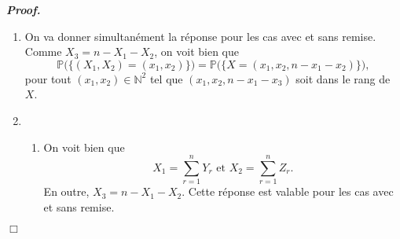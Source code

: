 \documentclass[11pt,a4paper]{article}
\newcommand{\NN}{\mathbb{N}}
\newenvironment{preuve}[1][]
{\vskip 2mm  \noindent\emph{\bf Proof#1. }}{$\Box$ \vskip 2mm}
\begin{document}
\begin{preuve}
\begin{enumerate}
				\item On va donner simultanément la réponse pour les cas avec et sans remise.
				Comme $X_{3} = n - X_{1} - X_{2}$, on voit bien que 
				\[     \mathbb{P}\big(\{(X_{1},X_{2}) = (x_{1},x_{2}) \}\big) = \mathbb{P}\big(\{X = (x_{1},x_{2},n-x_{1}-x_{2}) \}\big),      \]
				pour tout $(x_{1},x_{2}) \in \NN^{2}$ tel que $(x_{1},x_{2}, n-x_{1}-x_{3})$ soit dans le rang de $X$. 
				
				\item 
				\begin{enumerate}[label=(\roman*)]
					\item On voit bien que 
					\[     X_{1} = \sum_{r=1}^{n} Y_{r}  \text{ et } X_{2} = \sum_{r=1}^{n} Z_{r}.     \]
					En outre, $X_{3} = n - X_{1} - X_{2}$. 
					Cette réponse est valable pour les cas avec et sans remise. 
					

\end{enumerate}
\end{enumerate}
\end{preuve}
\end{document}

